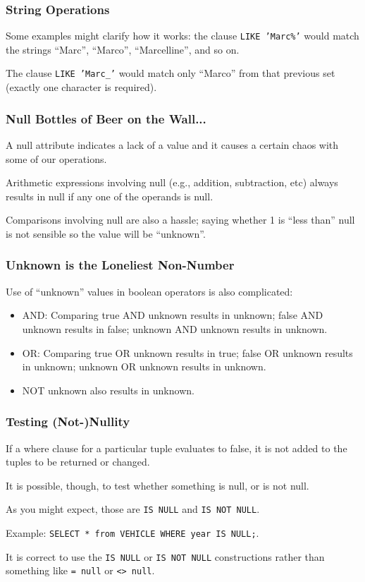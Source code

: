 \begin{frame}
\frametitle{String Operations}

Some examples might clarify how it works: the clause \texttt{LIKE 'Marc\%'} would match the strings ``Marc'', ``Marco'', ``Marcelline'', and so on. 

The clause \texttt{LIKE 'Marc\_'} would match only ``Marco'' from that previous set (exactly one character is required). 


\end{frame}



\begin{frame}
\frametitle{Null Bottles of Beer on the Wall...}

A null attribute indicates a lack of a value and it causes a certain chaos with some of our operations.

Arithmetic expressions involving null (e.g., addition, subtraction, etc) always results in null if any one of the operands is null. 

Comparisons involving null are also a hassle; saying whether 1 is ``less than'' null is not sensible so the value will be ``unknown''.

\end{frame}



\begin{frame}
\frametitle{Unknown is the Loneliest Non-Number}

Use of ``unknown'' values in boolean operators is also complicated:

\begin{itemize}
	\item  AND: Comparing true AND unknown results in unknown; false AND unknown results in false; unknown AND unknown results in unknown.
	\item OR: Comparing true OR unknown results in true; false OR unknown results in unknown; unknown OR unknown results in unknown.
	\item NOT unknown also results in unknown.
\end{itemize}

\end{frame}



\begin{frame}
\frametitle{Testing (Not-)Nullity}

If a where clause for a particular tuple evaluates to false, it is not added to the tuples to be returned or changed. 

It is possible, though, to test whether something is null, or is not null. 

As you might expect, those are \texttt{IS NULL} and \texttt{IS NOT NULL}. 

Example: \texttt{SELECT * from VEHICLE WHERE year IS NULL;}.

It is correct to use the \texttt{IS NULL} or \texttt{IS NOT NULL} constructions rather than something like \texttt{= null} or \texttt{<> null}.

\end{frame}



